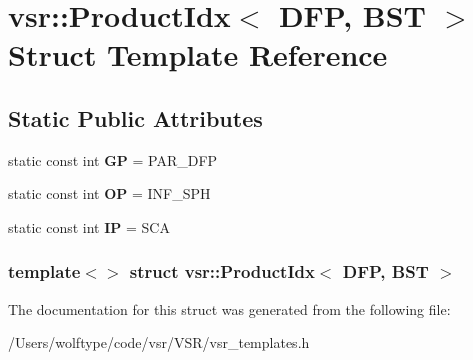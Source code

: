 \hypertarget{structvsr_1_1_product_idx_3_01_d_f_p_00_01_b_s_t_01_4}{\section{vsr\-:\-:Product\-Idx$<$ D\-F\-P, B\-S\-T $>$ Struct Template Reference}
\label{structvsr_1_1_product_idx_3_01_d_f_p_00_01_b_s_t_01_4}
}
\subsection*{Static Public Attributes}
\begin{DoxyCompactItemize}
\item 
\hypertarget{structvsr_1_1_product_idx_3_01_d_f_p_00_01_b_s_t_01_4_a9556fddaca4794c95c21104ac37d8b19}{static const int {\bfseries G\-P} = P\-A\-R\-\_\-\-D\-F\-P}\label{structvsr_1_1_product_idx_3_01_d_f_p_00_01_b_s_t_01_4_a9556fddaca4794c95c21104ac37d8b19}

\item 
\hypertarget{structvsr_1_1_product_idx_3_01_d_f_p_00_01_b_s_t_01_4_a95723e253e5d9891fe81fc9e27478b77}{static const int {\bfseries O\-P} = I\-N\-F\-\_\-\-S\-P\-H}\label{structvsr_1_1_product_idx_3_01_d_f_p_00_01_b_s_t_01_4_a95723e253e5d9891fe81fc9e27478b77}

\item 
\hypertarget{structvsr_1_1_product_idx_3_01_d_f_p_00_01_b_s_t_01_4_a9bdaf5248acf5372b0357f0c061fe3db}{static const int {\bfseries I\-P} = S\-C\-A}\label{structvsr_1_1_product_idx_3_01_d_f_p_00_01_b_s_t_01_4_a9bdaf5248acf5372b0357f0c061fe3db}

\end{DoxyCompactItemize}
\subsubsection*{template$<$$>$ struct vsr\-::\-Product\-Idx$<$ D\-F\-P, B\-S\-T $>$}



The documentation for this struct was generated from the following file\-:\begin{DoxyCompactItemize}
\item 
/\-Users/wolftype/code/vsr/\-V\-S\-R/vsr\-\_\-templates.\-h\end{DoxyCompactItemize}
